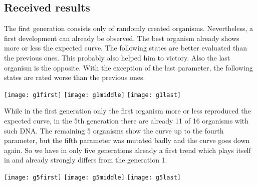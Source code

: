 \subsection{Received results}
The first generation consists only of randomly created organisms. Nevertheless, a first development can already be observed. The best organism already shows more or less the expected curve. The following states are better evaluated than the previous ones. This probably also helped him to victory. Also the last organism is the opposite. With the exception of the last parameter, the following states are rated worse than the previous ones.
\begin{fixedpic}
	\centering
	\texttt{[image: g1first]}
	\texttt{[image: g1middle]}
	\texttt{[image: g1last]}
\end{fixedpic}
\begin{fixedpic}
\end{fixedpic}
While in the first generation only the first organism more or less reproduced the expected curve, in the 5th generation there are already 11 of 16 organisms with such DNA. The remaining 5 organisms show the curve up to the fourth parameter, but the fifth parameter was mutated badly and the curve goes down again. So we have in only five generations already a first trend which plays itself in and already strongly differs from the generation 1.
\begin{fixedpic}
	\centering
	\texttt{[image: g5first]}
	\texttt{[image: g5middle]}
	\texttt{[image: g5last]}
\end{fixedpic}



